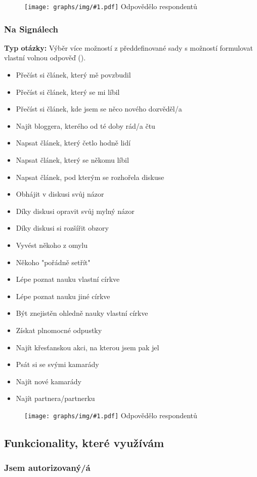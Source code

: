 \documentclass[12pt, a4paper, twoside]{article}
\newcommand{\answercount}[1]{Odpovědělo  respondentů}
\newcommand{\includegraph}[2]{
  \begin{figure}[H]
    \centering
    \textbf{#2}
    \texttt{[image: graphs/img/\#1.pdf]}
    \answercount{#1}
  \end{figure}
}
\newcommand{\qtype}{\textbf{Typ otázky:}
}
\newcommand{\pickMultiple}{Výběr více možností z předdefinované sady\xspace}
\newcommand{\withOther}{s možností formulovat vlastní volnou odpověď (\uv{Jiné})\xspace}
\begin{document}
\includegraph{signaly_jsem_vyuzil_k}{}

\subsubsection{Na Signálech }

\qtype \pickMultiple \withOther.

\begin{itemize}
\item Přečíst si článek, který mě povzbudil
\item Přečíst si článek, který se mi líbil
\item Přečíst si článek, kde jsem se něco nového dozvěděl/a
\item Najít bloggera, kterého od té doby rád/a čtu
\item Napsat článek, který četlo hodně lidí
\item Napsat článek, který se někomu líbil
\item Napsat článek, pod kterým se rozhořela diskuse
\item Obhájit v diskusi svůj názor
\item Díky diskusi opravit svůj mylný názor
\item Díky diskusi si rozšířit obzory
\item Vyvést někoho z omylu
\item Někoho "pořádně setřít"
\item Lépe poznat nauku vlastní církve
\item Lépe poznat nauku jiné církve
\item Být znejistěn ohledně nauky vlastní církve
\item Získat plnomocné odpustky
\item Najít křesťanskou akci, na kterou jsem pak jel
\item Psát si se svými kamarády
\item Najít nové kamarády
\item Najít partnera/partnerku
\end{itemize}

\includegraph{na_signalech_se_mi_povedlo}{}

\subsection{Funkcionality, které využívám}\label{sec:funkcionality}

\subsubsection{Jsem autorizovaný/á}\label{sec:autorizovany}
\end{document}
